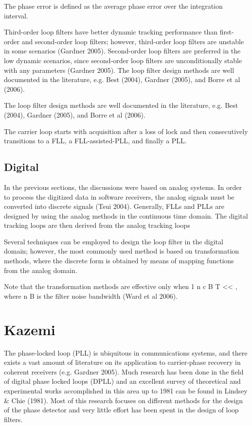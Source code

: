 The phase error is defined as the average phase error over the integration interval. 

Third-order loop filters have better dynamic tracking performance than first-order and second-order loop filters; however, third-order loop filters are unstable in some scenarios (Gardner 2005). Second-order loop filters are preferred in the low dynamic scenarios, since second-order loop filters are unconditionally stable with any parameters (Gardner 2005). The loop filter design methods are well documented in the literature, e.g. Best
(2004), Gardner (2005), and Borre et al (2006).

The loop filter design methods are well documented in the literature, e.g. Best
(2004), Gardner (2005), and Borre et al (2006).

The carrier loop starts with acquisition after a
loss of lock and then consecutively transitions to a FLL, a FLL-assisted-PLL, and finally
a PLL.

\subsection{Digital}


In the previous sections, the discussions were based on analog systems. In order to
process the digitized data in software receivers, the analog signals must be converted into
discrete signals (Tsui 2004). Generally, FLLs and PLLs are designed by using the analog
methods in the continuous time domain. The digital tracking loops are then derived from
the analog tracking loops


Several techniques can be employed to design the loop filter in
the digital domain; however, the most commonly used method is based on transformation
methods, where the discrete form is obtained by means of mapping functions from the
analog domain.

Note that the transformation methods are effective only when 1 n c B T << , where n B is the
filter noise bandwidth (Ward et al 2006).

\section{Kazemi}

The phase-locked loop (PLL) is ubiquitous in communications systems, and there exists a vast amount of literature on its application to carrier-phase recovery in coherent receivers (e.g. Gardner 2005)\cite{Gardner}. Much research has been done in the field of digital phase locked loops (DPLL) and an excellent survey of theoretical and experimental works accomplished in this area up to 1981 can be found in Lindsey \& Chie \cite{Lindsey} (1981). Most of this research focuses on different methods for the design of the phase detector and very little effort has been spent in the design of loop filters.


